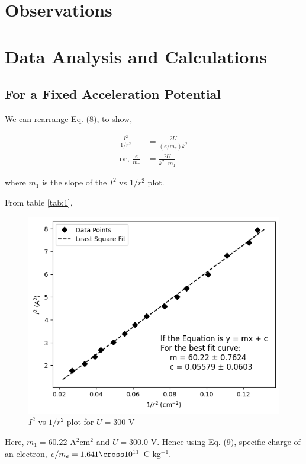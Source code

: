 \section{Observations}






\section{Data Analysis and Calculations}

\subsection{For a Fixed Acceleration Potential}
    We can rearrange Eq. (8), to show,

    \begin{align}
        \frac{I^2}{1/r^2} &= \frac{2U}{(e/m_e)k^2} \nonumber\\
        \text{or, }\frac{e}{m_e} &= \frac{2U}{k^2\cdot m_1}
    \end{align}

    where $m_1$ is the slope of the $I^2$ vs $1/r^2$ plot.

    From table \ref{tab:1}, 

    \begin{figure}[H]
        \centering
        \includegraphics[height=0.7\columnwidth]{images/g1.png}
        \caption{$I^2$ vs $1/r^2$ plot for $U=300$ V}
        \label{graph:1}
    \end{figure}

    Here, $m_1=60.22$ A$^2$cm$^2$ and $U=300.0$ V. Hence using Eq. (9), specific charge of an electron, $e/m_e=1.641\cross10^{11}$ C kg$^{-1}$.

